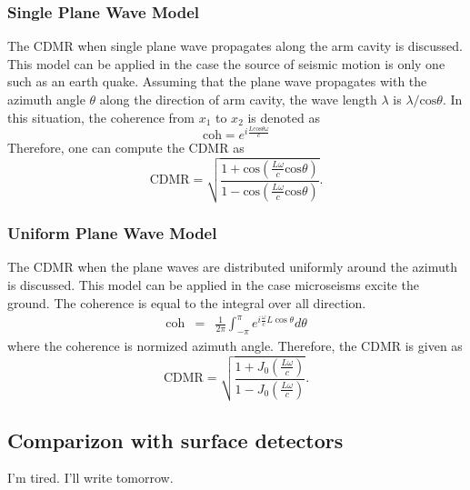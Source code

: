 \documentclass[a4paper,12pt]{book}
\begin{document}
\subsubsection{Single Plane Wave Model}
The CDMR when single plane wave propagates along the arm cavity is discussed. This model can be applied in the case the source of seismic motion is only one such as an earth quake. Assuming that the plane wave propagates with the azimuth angle $\theta$ along the direction of arm cavity, the wave length $\lambda$ is $\lambda/\mathrm{cos}\theta$. In this situation, the coherence from $x_1$ to $x_2$ is denoted as
\begin{equation}
  \mathrm{coh}=e^{i\frac{L\mathrm{cos}\theta\omega}{c}}
\end{equation}
Therefore, one can compute the CDMR as
\begin{equation}  \label{eq:eq18}
  \mathrm{CDMR} = \sqrt{\frac{1+\mathrm{cos}(\frac{L\omega}{c}\mathrm{cos}\theta)}{1-\mathrm{cos}(\frac{L\omega}{c}\mathrm{cos}\theta)}}.
\end{equation}



\subsubsection{Uniform Plane Wave Model}
The CDMR when the plane waves are distributed uniformly around the azimuth is discussed. This model can be applied in the case microseisms excite the ground. The coherence is equal to the integral over all direction.
\begin{eqnarray} \label{eq:eq19}
  \mathrm{coh} &=& \frac{1}{2\pi} \int_{-\pi}^{\pi} e^{i\frac{\omega}{c} L\cos \theta} d \theta
\end{eqnarray}
where the coherence is normized azimuth angle. Therefore, the CDMR is given as
\begin{equation}  \label{eq:eq20}
  \mathrm{CDMR} = \sqrt{\frac{1+J_0(\frac{L\omega}{c})}{1-J_0(\frac{L\omega}{c})}} .
\end{equation}


\subsection{Comparizon with surface detectors}
I'm tired. I'll write tomorrow.
\end{document}
